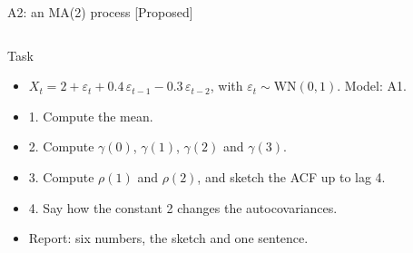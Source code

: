 \begin{frame}{A2: an MA(2) process [Proposed]}
\propsub
\itemsize{\scriptsize}
\begin{columns}[T]
\begin{column}{\taskw}
\begin{block}{Task}
\begin{itemize}
    \item $X_t = 2 + \varepsilon_t + 0.4\,\varepsilon_{t-1} - 0.3\,\varepsilon_{t-2}$, with $\varepsilon_t \sim \mathrm{WN}(0, 1)$. Model: A1.
    \item 1. Compute the mean.
    \item 2. Compute $\gamma(0)$, $\gamma(1)$, $\gamma(2)$ and $\gamma(3)$.
    \item 3. Compute $\rho(1)$ and $\rho(2)$, and sketch the ACF up to lag 4.
    \item 4. Say how the constant 2 changes the autocovariances.
    \item Report: six numbers, the sketch and one sentence.
\end{itemize}
\end{block}
\end{column}
\begin{column}{\solw}
\end{column}
\end{columns}
\end{frame}

